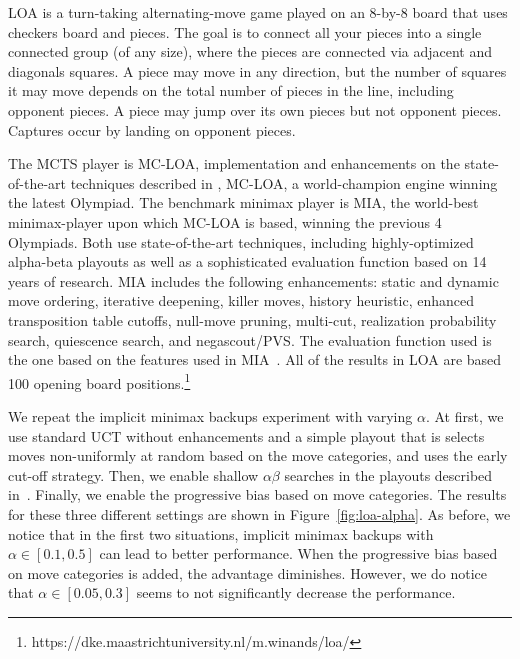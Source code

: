 \documentclass[conference]{IEEEtran}
\begin{document}
LOA is a turn-taking alternating-move game played on an 8-by-8 board that uses checkers board and pieces.
The goal is to connect all your pieces into a single connected group (of any size), 
where the pieces are connected via adjacent and diagonals squares. A piece may move in any direction, but the number of squares 
it may move depends on the total number of pieces in the line, including opponent pieces. A piece may jump over its own
pieces but not opponent pieces. Captures occur by landing on opponent pieces. 

The MCTS player is MC-LOA, implementation and enhancements on the state-of-the-art techniques described in \cite{Winands10MCTS-LOA}, 
MC-LOA, a world-champion engine winning the latest Olympiad. The benchmark minimax player is MIA, the world-best minimax-player upon 
which MC-LOA is based, winning the previous 4 Olympiads. Both use state-of-the-art techniques, including highly-optimized alpha-beta 
playouts as well as a sophisticated evaluation function based on 14 years of research. MIA includes the following enhancements: static
and dynamic move ordering, iterative deepening, killer moves, history heuristic, enhanced transposition table cutoffs, null-move pruning, 
multi-cut, realization probability search, quiescence search, and negascout/PVS. 
The evaluation function used is the one based on the features used in MIA~\cite{Winands06MIA}.
All of the results in LOA are based 100 opening board 
positions.\footnote{\small https://dke.maastrichtuniversity.nl/m.winands/loa/} 

We repeat the implicit minimax backups experiment with varying $\alpha$. At first, we use standard UCT without enhancements 
and a simple playout that is selects moves non-uniformly at random based on the move categories, and uses the early cut-off strategy. 
Then, we enable shallow $\alpha \beta$ searches in the playouts described in~\cite{Winands11AB}. 
Finally, we enable the progressive bias based on move categories. The results for these 
three different settings are shown in Figure~\ref{fig:loa-alpha}. As before, we notice that in the first two situations,
implicit minimax backups with $\alpha \in [0.1,0.5]$ can lead to better performance. When the progressive bias based on move 
categories is added, the advantage diminishes. However, we do notice that $\alpha \in [0.05,0.3]$ seems to not significantly 
decrease the performance. 
\end{document}
